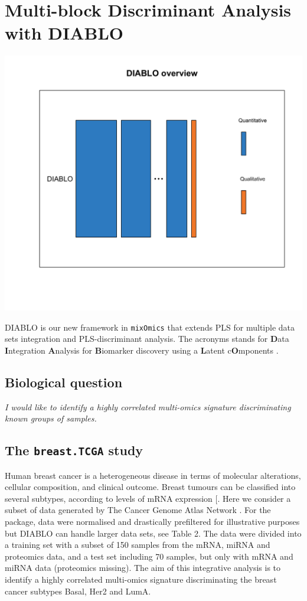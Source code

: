 \documentclass[]{book}
\theoremstyle{definition}
\theoremstyle{definition}
\theoremstyle{definition}
\theoremstyle{remark}
\begin{document}
\chapter{Multi-block Discriminant Analysis with DIABLO}\label{diablo}

\begin{center}\includegraphics[width=0.5\linewidth]{Figures/overview-DIABLO-1} \end{center}

DIABLO is our new framework in \texttt{mixOmics} that extends PLS for
multiple data sets integration and PLS-discriminant analysis. The
acronyms stands for \textbf{D}ata \textbf{I}ntegration \textbf{A}nalysis
for \textbf{B}iomarker discovery using a \textbf{L}atent
c\textbf{O}mponents \citep{Sin16}.

\section{Biological question}\label{biological-question-3}

{ \emph{I would like to identify a highly correlated multi-omics
signature discriminating known groups of samples.} }

\section{\texorpdfstring{The \texttt{breast.TCGA}
study}{The breast.TCGA study}}\label{the-breast.tcga-study}

Human breast cancer is a heterogeneous disease in terms of molecular
alterations, cellular composition, and clinical outcome. Breast tumours
can be classified into several subtypes, according to levels of mRNA
expression {[}\citet{Sor01}. Here we consider a subset of data generated
by The Cancer Genome Atlas Network \citep{TCGA12}. For the package, data
were normalised and drastically prefiltered for illustrative purposes
but DIABLO can handle larger data sets, see \citep{mixomics} Table 2.
The data were divided into a training set with a subset of 150 samples
from the mRNA, miRNA and proteomics data, and a test set including 70
samples, but only with mRNA and miRNA data (proteomics missing). The aim
of this integrative analysis is to identify a highly correlated
multi-omics signature discriminating the breast cancer subtypes Basal,
Her2 and LumA.
\end{document}
